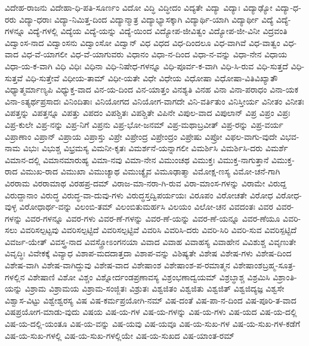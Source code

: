 {ವಿದೇಹ-ರಾಜನು
ವಿದೇಹಾ-ಧಿ-ಪತಿ-ಸೂರ್ಣಂ
ವಿದೋ
ವಿದ್ಧಿ
ವಿದ್ಧೀದಂ
ವಿದ್ಯತೇ
ವಿದ್ಯಾ
ವಿದ್ಯಾಃ
ವಿದ್ಯಾಢ್ಯೋ
ವಿದ್ಯಾ-ಧ-ರರು
ವಿದ್ಯಾ-ಧರಾಃ
ವಿದ್ಯಾ-ನಿಮಿತ್ತ-ದಿಂದ
ವಿದ್ಯಾನ್ಮಾತ್ರ
ವಿದ್ಯಾಭ್ಯಾಸಕ್ಕಾಗಿ
ವಿದ್ಯಾರ್ಥಿ-ಯಾಗಿ
ವಿದ್ಯಾರ್ಥೀ
ವಿದ್ಯೆ
ವಿದ್ಯೆ-ಗಳನ್ನೂ
ವಿದ್ಯೆ-ಗಳಲ್ಲಿ
ವಿದ್ಯೆಯ
ವಿದ್ಯೆ-ಯನ್ನು
ವಿದ್ಯೆ-ಯಿಂದ
ವಿದ್ಯೋಪ-ಜೀವಿತ್ವಂ
ವಿದ್ಯೋಪ-ಜೀ-ವಿನೀ
ವಿದ್ರವಂತಿ
ವಿದ್ವಾಂಸ-ನಾದ
ವಿದ್ವಾಂಸನು
ವಿದ್ವಾಂಸೋ
ವಿದ್ವಾನ್
ವಿಧ
ವಿಧದ
ವಿಧ-ದಿಂದಲೂ
ವಿಧ-ವಾಗಿವೆ
ವಿಧ-ವಾತ್ವಂ
ವಿಧ-ವಾದ
ವಿಧ-ವೆ-ಯಾಗಲೀ
ವಿಧ-ವೆ-ಯಾಗುವರು
ವಿಧಾನಂ
ವಿಧಾ-ನ-ದಿಂದ
ವಿಧಾ-ನ-ವನ್ನು
ವಿಧಾ-ನೇನ
ವಿಧಾಯ
ವಿಧಾ-ಯ-ಕ-ವಾಗಿ
ವಿಧಿ
ವಿಧಿಃ
ವಿಧಿನಾ
ವಿಧಿ-ನಿಷೇಧ-ಗಳನ್ನೂ
ವಿಧಿ-ಪೂರ್ವ-ಕ-ವಾಗಿ
ವಿಧಿ-ಸಿ-ರುವ
ವಿಧಿ-ಸುತ್ತದೆ
ವಿಧಿ-ಸುತ್ತವೆ
ವಿಧಿ-ಸುತ್ತೇವೆ
ವಿಧೀಯ-ತಾಮ್
ವಿಧೀ-ಯತೇ
ವಿಧೇ
ವಿಧೇಯ
ವಿಧೋಷಾ
ವಿಧೋಷಾ-ವಿತಿವಿಖ್ಯಾತೌ
ವಿಧ್ಯಾತ್ಮರ್ಮಾಣ್ಯಪಿ
ವಿಧ್ಯುಕ್ತ-ವಾದ
ವಿನ-ಯ-ದಿಂದ
ವಿನ-ಯಾತ್ತಂ
ವಿನಶ್ಯತಿ
ವಿನಹ
ವಿನಾ
ವಿನಾ-ಪರಾಧಂ
ವಿನಾ-ಯಕ
ವಿನಾ-ಽತ್ಯರ್ಥಪ್ರಸಾದಃ
ವಿನಿಂದಿತಾಃ
ವಿನಿಯೋಗದ
ವಿನಿಯೋಗ-ವಾಗದೇ
ವಿನಿ-ವರ್ತಿತುಂ
ವಿನಿಸ್ತೀರ್ಯ
ವಿನೀತಂ
ವಿನೀತಃ
ವಿಪತ್ತನ್ನು
ವಿಪತ್ತನ್ನೂ
ವಿಪತ್ತು
ವಿಪದಂ
ವಿಪಶ್ಚಿತಃ
ವಿಪಶ್ಚಿತೇ
ವಿಪಿನೇ
ವಿಪುಲ-ವಾದ
ವಿಪುಲಾನ್
ವಿಪ್ರ
ವಿಪ್ರಂ
ವಿಪ್ರಃ
ವಿಪ್ರ-ಕುಲೇ
ವಿಪ್ರ-ನನ್ನು
ವಿಪ್ರ-ನಿಗೆ
ವಿಪ್ರನು
ವಿಪ್ರ-ಭೋ-ಜನಮ್
ವಿಪ್ರ-ಮಥಾಬ್ರವೀತ್
ವಿಪ್ರ-ರನ್ನು
ವಿಪ್ರ-ವರ್ಯ
ವಿಪ್ರಾಣಾಂ
ವಿಪ್ರಾನ್
ವಿಪ್ರಾಯ
ವಿಪ್ರಾಸ್ತು
ವಿಪ್ರೇ
ವಿಪ್ರೇಂದ್ರ
ವಿಪ್ರೇಂದ್ರಂ
ವಿಪ್ರೇಷು
ವಿಪ್ರೋ
ವಿಫಲ-ವಾಗು-ವುದೇ
ವಿಭವ-ನಾಮ
ವಿಭುಃ
ವಿಭುಶ್ಚ
ವಿಭ್ರಮಸ್ಯ
ವಿಮನೀ-ಕೃತಃ
ವಿಮರ್ಶನೆ-ಯನ್ನಾಗಲೀ
ವಿಮರ್ಶಿಸಿ
ವಿಮರ್ಶಿಸಿ-ದರು
ವಿಮರ್ಶೆ
ವಿಮಾನ-ದಲ್ಲಿ
ವಿಮಾನಮಾರುಹ್ಯ
ವಿಮಾ-ನವು
ವಿಮಾ-ನೇನ
ವಿಮುಂಚಥ
ವಿಮುಕ್ತಃ
ವಿಮುಕ್ತ-ನಾಗುತ್ತಾನೆ
ವಿಮುಕ್ತ-ರಾದ
ವಿಮುಖ-ರಾದ
ವಿಮುಖಾ
ವಿಮುಚ್ಯಾಥ
ವಿಮುಚ್ಯೈವ
ವಿಮೂಢಾತ್ಮಾ
ವಿಮೋಕ್ಷ-ಣಸ್ಯ
ವಿಮೋ-ಚನೆ-ಗಾಗಿ
ವಿರರಾಮ
ವಿರರಾಮಾಥ
ವಿರಹಪ್ರ-ದಮ್
ವಿರಾಜ-ಮಾ-ನರಾ-ಗಿ-ರುವ
ವಿರಾ-ಮಾಂಸ-ಗಳನ್ನು
ವಿರಾಮೇ
ವಿರುದ್ದ
ವಿರುದ್ದಾನಾಂ
ವಿರುದ್ಧ
ವಿರುದ್ಧ-ವಾ-ದುವು-ಗಳು
ವಿರುದ್ಧಸ್ತದ್ವಿಪರ್ಯಯಃ
ವಿರೂಪಂ
ವಿರೋಚತೇ
ವಿರೋಧ
ವಿರೋಧ-ವುಳ್ಳ
ವಿರೋಧಾರ್ಥ-ವನ್ನು
ವಿಲಂಬಿ-ತಮ್
ವಿಲಂಬಿತುಮರ್ಹಸಿ
ವಿಲಯಂ
ವಿಲೋ-ಚನ
ವಿವದಂತಃ
ವಿವರ
ವಿವರ-ಗಳನ್ನು
ವಿವರ-ಗಳನ್ನೂ
ವಿವರ-ಗಳು
ವಿವರ-ಣೆ-ಗಳನ್ನು
ವಿವರ-ಣೆ-ಯನ್ನು
ವಿವರ-ಣೆ-ಯನ್ನೂ
ವಿವರ-ಣೆಯೂ
ವಿವರಿ-ಸಲು
ವಿವರಿಸಲ್ಪಟ್ಟವು
ವಿವರಿಸಲ್ಪಟ್ಟಿದೆ
ವಿವರಿಸಲ್ಪಟ್ಟಿವೆ
ವಿವರಿಸಿ
ವಿವರಿಸಿ-ದರು
ವಿವರಿ-ಸಿರಿ
ವಿವರಿ-ಸುವ
ವಿವರಿಸ್ಪಟ್ಟಿದೆ
ವಿವರ್ಜ-ಯೇತ್
ವಿವಸ್ತ್ರ-ನಾದ
ವಿವಸ್ತ್ರೋಽಂಗನಯಾ
ವಿವಾದ
ವಿವಾಹ
ವಿವಾಹಸ್ಯ
ವಿವಾಹೇನ
ವಿವಿಶುಶ್ಚ
ವಿವೃಣುತೇ
ವಿವೃದ್ಧಿಃ
ವಿವೇಕಕ್ಕೆ
ವಿವ್ಯಾಧ
ವಿಶಾಪ-ಮದದಾತ್ತದಾ
ವಿಶಾಪ-ವನ್ನು
ವಿಶಿಷ್ಯತೇ
ವಿಶೇಷ
ವಿಶೇಷ-ಗಳು
ವಿಶೇಷ-ದಿಂದ
ವಿಶೇಷ-ವಾಗಿ
ವಿಶೇಷ-ವಾಗಿದ್ದುವು
ವಿಶೇಷ-ವಾದ
ವಿಶೇಷಾಂಶ
ವಿಶೇಷಾಂಶ-ಪ-ರಮಾತ್ಮನ
ವಿಶೇಷಾಂಶಬ್ರಹ್ಮ-ಸೂತ್ರ-ಗಳಲ್ಲಿನ
ವಿಶೇಷಾಣಿ
ವಿಶೋ
ವಿಶ್ಚಂ
ವಿಶ್ನೋರ್ದಂಡಪ್ರಣಾವಸ್ಯ
ವಿಶ್ರಂಭಣಾದ್ವಯಮ್
ವಿಶ್ರಬ್ಧಾಶ್ಚ
ವಿಶ್ರಮಿಸಿ
ವಿಶ್ರಾಂತಿ-ಯನ್ನು
ವಿಶ್ರಾಮ
ವಿಶ್ರಾಮಯ
ವಿಶ್ರಾಮ-ಸಂಜ್ಜಿತಃ
ವಿಶ್ರುತಃ
ವಿಶ್ವಜಿತಂ
ವಿಶ್ವಜಿತು
ವಿಶ್ವಜಿತ್
ವಿಶ್ವಜಿದ್ಯಜ್ಞ
ವಿಶ್ವಸೇ
ವಿಶ್ವಾಸ-ವಿಟ್ಟು
ವಿಶ್ವೇಶ್ವರಸ್ಯ
ವಿಷ
ವಿಷ-ಕರ್ಮಪ್ರಯೋಗಿ-ನಮ್
ವಿಷ-ದಂತೆ
ವಿಷ-ಪಾ-ನ-ದಿಂದ
ವಿಷ-ಪೂರಿ-ತ-ವಾದ
ವಿಷಪ್ರಯೋಗ-ಮಾಡು-ವುದು
ವಿಷಯ
ವಿಷ-ಯ-ಗಳ
ವಿಷ-ಯ-ಗಳನ್ನು
ವಿಷ-ಯ-ಗಳು
ವಿಷ-ಯದ
ವಿಷ-ಯ-ದಲ್ಲಿ
ವಿಷ-ಯ-ದಲ್ಲಿ-ಯಂತೂ
ವಿಷ-ಯ-ವನ್ನು
ವಿಷ-ಯವು
ವಿಷ-ಯವೂ
ವಿಷ-ಯ-ಸುಖ-ಗಳ
ವಿಷ-ಯ-ಸುಖ-ಗಳ-ಕಡೆಗೆ
ವಿಷ-ಯ-ಸುಖ-ಗಳಲ್ಲಿ
ವಿಷ-ಯ-ಸುಖ-ಗಳಲ್ಲಿಯೇ
ವಿಷ-ಯ-ಸುಖದ
ವಿಷ-ಯಾಂತ-ರಮ್
}
